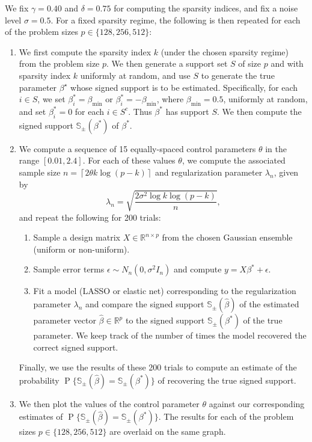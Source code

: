 \documentclass[letterpaper,12pt]{article}
\DeclareMathOperator{\prob}{P}
\newcommand{\ceil}[1]{\left\lceil#1\right\rceil}
\begin{document}
We fix $\gamma = 0.40$ and $\delta = 0.75$ for computing the sparsity
indices, and fix a noise level $\sigma = 0.5$. For a fixed sparsity
regime, the following is then repeated for each of the problem sizes
$p \in \{128, 256, 512\}$:

\begin{enumerate}
\item We first compute the sparsity index $k$ (under the chosen
  sparsity regime) from the problem size $p$. We then generate a
  support set $S$ of size $p$ and with sparsity index $k$ uniformly at
  random, and use $S$ to generate the true parameter $\beta^\star$
  whose signed support is to be estimated. Specifically, for each
  $i \in S$, we set $\beta^\ast_i = \beta_{\mathrm{min}}$ or
  $\beta^\ast_i = -\beta_{\mathrm{min}}$, where
  $\beta_{\mathrm{min}} = 0.5$, uniformly at random, and set
  $\beta^\ast_i = 0$ for each $i \in S^c$. Thus $\beta^\ast$ has
  support $S$. We then compute the signed support
  $\mathbb{S}_\pm(\beta^\ast)$ of $\beta^\ast$.

\item We compute a sequence of 15 equally-spaced control parameters
  $\theta$ in the range $[0.01, 2.4]$. For each of these values
  $\theta$, we compute the associated sample size
  $n = \ceil{2 \theta k \log(p - k)}$ and regularization parameter
  $\lambda_n$, given by
    \begin{equation*}
      \lambda_n = \sqrt{\frac{2\sigma^2 \log k \log(p - k)}{n}},
    \end{equation*}
    and repeat the following for 200 trials:
  \begin{enumerate}
  \item Sample a design matrix $X \in \mathbb{R}^{n \times p}$ from
    the chosen Gaussian ensemble (uniform or non-uniform).
  \item Sample error terms $\epsilon \sim N_n(0, \sigma^2 I_n)$ and
    compute $y = X\beta^\ast + \epsilon$.
  \item Fit a model (LASSO or elastic net) corresponding to the
    regularization parameter $\lambda_n$ and compare the signed
    support $\mathbb{S}_\pm(\hat{\beta})$ of the estimated parameter
    vector $\hat{\beta} \in \mathbb{R}^p$ to the signed support
    $\mathbb{S}_\pm(\beta^\ast)$ of the true parameter. We keep track
    of the number of times the model recovered the correct signed
    support.
  \end{enumerate}
  Finally, we use the results of these 200 trials to compute an
  estimate of the probability
  $\prob\{\mathbb{S}_\pm(\hat{\beta}) = \mathbb{S}_\pm(\beta^\ast)\}$
  of recovering the true signed support.

\item We then plot the values of the control parameter $\theta$
  against our corresponding estimates of
  $\prob\{\mathbb{S}_\pm(\hat{\beta}) =
  \mathbb{S}_\pm(\beta^\ast)\}$. The results for each of the problem
  sizes $p \in \{128, 256, 512\}$ are overlaid on the same graph.
\end{enumerate}
\end{document}
